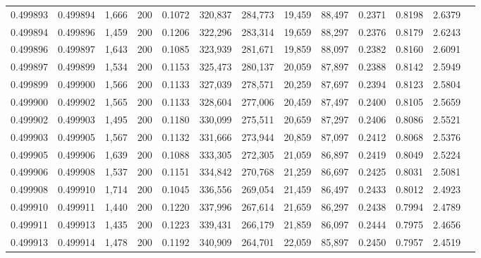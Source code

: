\begin{tabular}{rrrrrrrrrrrrr}
0.499893 & 0.499894 &  1,666 & 200 &                                     0.1072 & 320,837 & 284,773 &  19,459 &  88,497 & 0.2371 & 0.8198 & 2.6379 \\
0.499894 & 0.499896 &  1,459 & 200 &                                     0.1206 & 322,296 & 283,314 &  19,659 &  88,297 & 0.2376 & 0.8179 & 2.6243 \\
0.499896 & 0.499897 &  1,643 & 200 &                                     0.1085 & 323,939 & 281,671 &  19,859 &  88,097 & 0.2382 & 0.8160 & 2.6091 \\
0.499897 & 0.499899 &  1,534 & 200 &                                     0.1153 & 325,473 & 280,137 &  20,059 &  87,897 & 0.2388 & 0.8142 & 2.5949 \\
0.499899 & 0.499900 &  1,566 & 200 &                                     0.1133 & 327,039 & 278,571 &  20,259 &  87,697 & 0.2394 & 0.8123 & 2.5804 \\
0.499900 & 0.499902 &  1,565 & 200 &                                     0.1133 & 328,604 & 277,006 &  20,459 &  87,497 & 0.2400 & 0.8105 & 2.5659 \\
0.499902 & 0.499903 &  1,495 & 200 &                                     0.1180 & 330,099 & 275,511 &  20,659 &  87,297 & 0.2406 & 0.8086 & 2.5521 \\
0.499903 & 0.499905 &  1,567 & 200 &                                     0.1132 & 331,666 & 273,944 &  20,859 &  87,097 & 0.2412 & 0.8068 & 2.5376 \\
0.499905 & 0.499906 &  1,639 & 200 &                                     0.1088 & 333,305 & 272,305 &  21,059 &  86,897 & 0.2419 & 0.8049 & 2.5224 \\
0.499906 & 0.499908 &  1,537 & 200 &                                     0.1151 & 334,842 & 270,768 &  21,259 &  86,697 & 0.2425 & 0.8031 & 2.5081 \\
0.499908 & 0.499910 &  1,714 & 200 &                                     0.1045 & 336,556 & 269,054 &  21,459 &  86,497 & 0.2433 & 0.8012 & 2.4923 \\
0.499910 & 0.499911 &  1,440 & 200 &                                     0.1220 & 337,996 & 267,614 &  21,659 &  86,297 & 0.2438 & 0.7994 & 2.4789 \\
0.499911 & 0.499913 &  1,435 & 200 &                                     0.1223 & 339,431 & 266,179 &  21,859 &  86,097 & 0.2444 & 0.7975 & 2.4656 \\
0.499913 & 0.499914 &  1,478 & 200 &                                     0.1192 & 340,909 & 264,701 &  22,059 &  85,897 & 0.2450 & 0.7957 & 2.4519 \\

\end{tabular}
